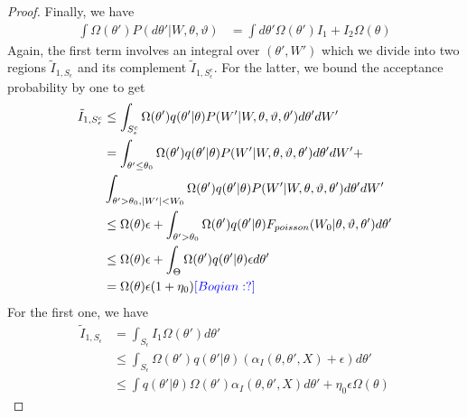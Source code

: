 \begin{proof}
Finally, we have
\begin{align*}
  \int \Omega(\theta') P(d\theta'| W, \theta, \vartheta)  
  &= \int d\theta' \Omega(\theta') I_1 + I_2 \Omega(\theta)
\end{align*}
Again, the first term involves an integral over $(\theta',W')$ which we 
divide into two regions $\tilde{I}_{1,S_\epsilon}$ and its complement 
$\tilde{I}_{1,S^c_\epsilon}$. For the latter, we bound the acceptance probability 
by one to get
\begin{align*}
  \tilde{I}_{1,S^c_\epsilon} &\le  \int_{S^c_\epsilon}  \Omega(\theta') q(\theta' | \theta)P(W' | W, \theta, \vartheta, \theta')d\theta'dW'\\
  &=  \int_{\theta' \leq \theta_0}  \Omega(\theta') q(\theta' | \theta)P(W' | W, \theta, \vartheta, \theta')d\theta'dW' + \\
&  \int_{\theta' > \theta_0, |W'| < W_0}  \Omega(\theta') q(\theta' | \theta)P(W' | W, \theta, \vartheta, \theta')d\theta'dW'\\
  & \leq  \Omega(\theta) \epsilon + \int_{\theta' > \theta_0} \Omega(\theta') q(\theta' | \theta)F_{poisson}(W_0 | \theta, \vartheta, \theta')d\theta'\\
  & \leq  \Omega(\theta) \epsilon + \int_{\Theta} \Omega(\theta') q(\theta' | \theta)\epsilon d\theta'\\
  &= \Omega(\theta) \epsilon (1 + \eta_0)
  \textcolor{blue}{[Boqian: ?]}
\end{align*}
For the first one, we have 
\begin{align*}
\tilde{I}_{1,S_\epsilon} &= \int_{S_\epsilon} I_1 \Omega(\theta') d\theta'\\
& \leq \int_{S_\epsilon} \Omega(\theta')q(\theta' | \theta) (\alpha_I(\theta, \theta', X) + \epsilon) d\theta' \\
& \leq \int q(\theta' | \theta) \Omega(\theta')\alpha_I(\theta, \theta', X) d\theta' + \eta_0 \epsilon \Omega(\theta)
\end{align*}


\end{proof}
